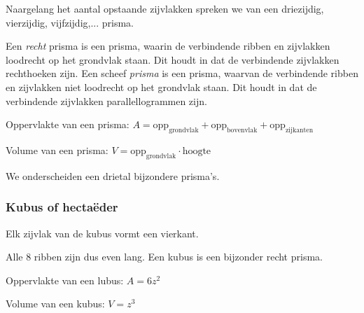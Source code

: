 Naargelang het aantal opstaande zijvlakken spreken we van een driezijdig, vierzijdig, vijfzijdig,... prisma.

Een \emph{recht} prisma is een prisma, waarin de verbindende ribben en zijvlakken loodrecht op het grondvlak staan. Dit houdt in dat de verbindende zijvlakken rechthoeken zijn. Een scheef \emph{prisma} is een prisma, waarvan de verbindende ribben en zijvlakken niet loodrecht op het grondvlak staan. Dit houdt in dat de verbindende zijvlakken parallellogrammen zijn.


		
\begin{ftonthoud}
		Oppervlakte van een prisma: $A=\text{opp}_{\text{grondvlak}}+\text{opp}_{\text{bovenvlak}}+\text{opp}_{\text{zijkanten}}$
		
		Volume van een prisma: $V=\text{opp}_{\text{grondvlak}}\cdot \text{hoogte}$
	
\end{ftonthoud}

We onderscheiden een drietal bijzondere prisma's.

\subsubsection{Kubus of hecta\"eder}
\begin{definitie}
	Elk zijvlak van de kubus vormt een vierkant.
\end{definitie}

Alle 8 ribben zijn dus even lang. Een kubus is een bijzonder recht prisma.



		
\begin{ftonthoud}
		Oppervlakte van een lubus: $A=6z^2$
		
		Volume van een kubus: $V=z^3$
\end{ftonthoud}
		

